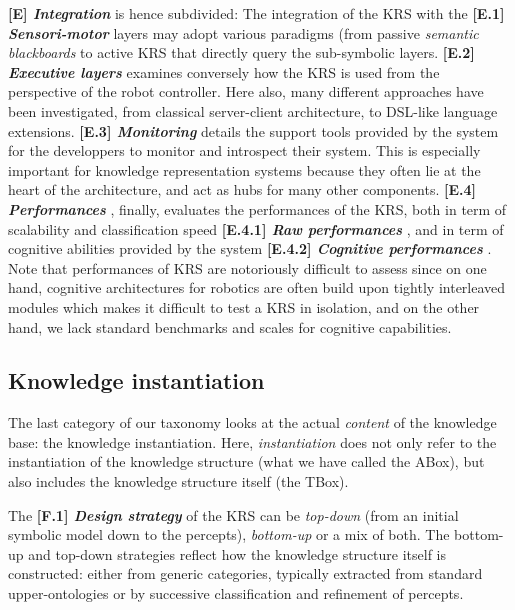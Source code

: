 \documentclass[journal]{IEEEtran}
\newcommand{\taxon}[2]{%
    \textbf{[#1] \emph{#2}}
}
\begin{document}
\taxon{E}{Integration} is hence subdivided: The integration of the KRS with the
\taxon{E.1}{Sensori-motor} layers may adopt various paradigms (from passive
\emph{semantic blackboards} to active KRS that directly query the sub-symbolic
layers. \taxon{E.2}{Executive layers} examines conversely how the KRS is used
from the perspective of the robot controller. Here also, many different
approaches have been investigated, from classical server-client architecture, to
DSL-like language extensions. \taxon{E.3}{Monitoring} details the support tools
provided by the system for the developpers to monitor and introspect their
system. This is especially important for knowledge representation systems
because they often lie at the heart of the architecture, and act as hubs for
many other components. \taxon{E.4}{Performances}, finally, evaluates the
performances of the KRS, both in term of scalability and classification speed
\taxon{E.4.1}{Raw performances}, and in term of cognitive abilities provided by
the system \taxon{E.4.2}{Cognitive performances}. Note that performances of KRS
are notoriously difficult to assess since on one hand, cognitive architectures
for robotics are often build upon tightly interleaved modules which makes it
difficult to test a KRS in isolation, and on the other hand, we lack standard
benchmarks and scales for cognitive capabilities.

\subsection{Knowledge instantiation}

The last category of our taxonomy looks at the actual \emph{content} of the
knowledge base: the knowledge instantiation. Here, \emph{instantiation} does
not only refer to the instantiation of the knowledge structure (what we have
called the ABox), but also includes the knowledge structure itself (the TBox).

The \taxon{F.1}{Design strategy} of the KRS can be \emph{top-down} (from an
initial symbolic model down to the percepts), \emph{bottom-up} or  a mix of
both. The bottom-up and top-down strategies reflect how the knowledge structure
itself is constructed: either from generic categories, typically extracted from
standard upper-ontologies or by successive classification and refinement of
percepts.
\end{document}
